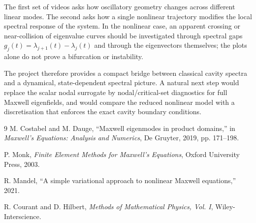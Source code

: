 \documentclass[10pt]{article}
\begin{document}
The first set of videos asks how oscillatory geometry changes across different linear modes.  The second asks how a single nonlinear trajectory modifies the local spectral response of the system.  In the nonlinear case, an apparent crossing or near-collision of eigenvalue curves should be investigated through spectral gaps $g_j(t)=\lambda_{j+1}(t)-\lambda_j(t)$ and through the eigenvectors themselves; the plots alone do not prove a bifurcation or instability.

The project therefore provides a compact bridge between classical cavity spectra and a dynamical, state-dependent spectral picture.  A natural next step would replace the scalar nodal surrogate by nodal/critical-set diagnostics for full Maxwell eigenfields, and would compare the reduced nonlinear model with a discretisation that enforces the exact cavity boundary conditions.

\begin{thebibliography}{9}
\small
{}
M. Costabel and M. Dauge, ``Maxwell eigenmodes in product domains,'' in \emph{Maxwell's Equations: Analysis and Numerics}, De Gruyter, 2019, pp. 171--198.

P. Monk, \emph{Finite Element Methods for Maxwell's Equations}, Oxford University Press, 2003.

R. Mandel, ``A simple variational approach to nonlinear Maxwell equations,'' 2021.

R. Courant and D. Hilbert, \emph{Methods of Mathematical Physics, Vol. I}, Wiley-Interscience.
\end{thebibliography}
\end{document}
